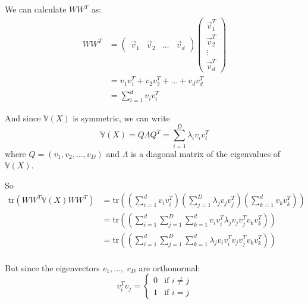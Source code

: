 \documentclass[11pt,letterpaper, leqno]{article}
\numberwithin{equation}{section}
\numberwithin{theorem}{section}
\numberwithin{lemma}{section}
\numberwithin{corollary}{section}
\numberwithin{definition}{section}
\numberwithin{proposition}{section}
\numberwithin{remark}{section}
\numberwithin{example}{section}
\newcommand{\V}{\mathbb{V}}
\begin{document}
\begin{enumerate}
            We can calculate $WW^T$ as:
            \begin{align*}
                WW^T &= \begin{pmatrix}
                    \vec v_1 & \vec v_2 & \dots & \vec v_d
                \end{pmatrix} \begin{pmatrix}
                    \vec v_1^T \\ \vec v_2^T \\ \vdots \\ \vec v_d^T
                \end{pmatrix}\\ 
                &= v_1v_1^T + v_2v_2^T + \dots + v_dv_d^T\\ 
                &= \sum_{i=1}^d v_iv_i^T
            \end{align*}

            And since $\V(X)$ is symmetric, we can write
            \[\V(X) = Q\Lambda Q^T = \sum_{i=1}^D \lambda_i v_i v_i^T\] 
            where $Q = (v_1, v_2, \dots, v_D)$ and $\Lambda$ is a diagonal matrix of the eigenvalues of $\V(X)$. 

            So 
            \begin{align*}
                \text{tr}(WW^T \V(X) WW^T) &= \text{tr}(\left(\sum_{i=1}^d v_iv_i^T\right)\left(\sum_{j=1}^D \lambda_j v_j v_j^T\right)\left(\sum_{k=1}^d v_kv_k^T\right))\\ 
                &= \text{tr}(\left(\sum_{i=1}^d \sum_{j=1}^D \sum_{k=1}^d v_iv_i^T \lambda_j v_j v_j^T v_kv_k^T\right))\\
                &= \text{tr}(\left(\sum_{i=1}^d \sum_{j=1}^D \sum_{k=1}^d \lambda_j v_iv_i^T v_j v_j^T v_kv_k^T\right))\\
            \end{align*}

            But since the eigenvectors $v_1, \dots,\; v_D$ are orthonormal:
            \[v_i^Tv_j = \begin{cases}
                 0 & \text{if } i \neq j \\
                1 & \text{if } i = j
            \end{cases}\]


\end{enumerate}
\end{document}

